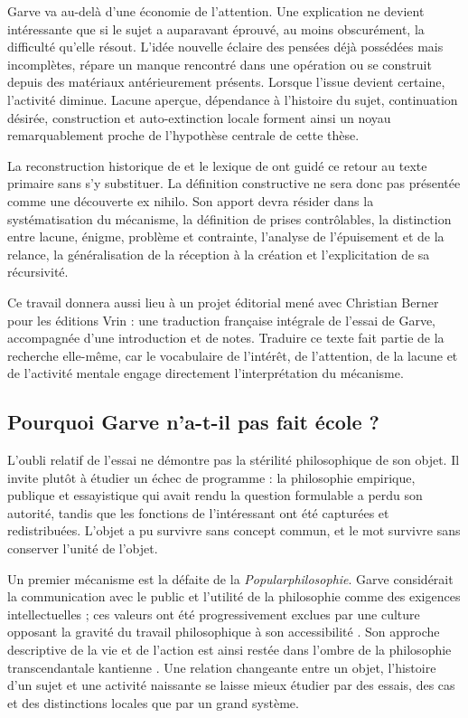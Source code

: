 \documentclass[11pt,a4paper]{article}
\begin{document}
Garve va au-delà d'une économie de l'attention. Une explication ne devient
intéressante que si le sujet a auparavant éprouvé, au moins obscurément, la
difficulté qu'elle résout. L'idée nouvelle éclaire des pensées déjà possédées
mais incomplètes, répare un manque rencontré dans une opération ou se construit
depuis des matériaux antérieurement présents. Lorsque l'issue devient certaine,
l'activité diminue. Lacune aperçue, dépendance à l'histoire du sujet,
continuation désirée, construction et auto-extinction locale forment ainsi un
noyau remarquablement proche de l'hypothèse centrale de cette thèse.

La reconstruction historique de \textcite{nannini2018garve} et le lexique de
\textcite{nannini2018interesting} ont guidé ce retour au texte primaire sans s'y
substituer. La définition constructive ne sera donc pas présentée comme une
découverte ex nihilo. Son apport devra résider dans la systématisation du
mécanisme, la définition de prises contrôlables, la distinction entre lacune,
énigme, problème et contrainte, l'analyse de l'épuisement et de la relance, la
généralisation de la réception à la création et l'explicitation de sa
récursivité.

Ce travail donnera aussi lieu à un projet éditorial mené avec Christian Berner
pour les éditions Vrin : une traduction française intégrale de l'essai de
Garve, accompagnée d'une introduction et de notes. Traduire ce texte fait partie
de la recherche elle-même, car le vocabulaire de l'intérêt, de l'attention, de
la lacune et de l'activité mentale engage directement l'interprétation du
mécanisme.

\subsection{Pourquoi Garve n'a-t-il pas fait école ?}

L'oubli relatif de l'essai ne démontre pas la stérilité philosophique de son
objet. Il invite plutôt à étudier un échec de programme : la philosophie
empirique, publique et essayistique qui avait rendu la question formulable a
perdu son autorité, tandis que les fonctions de l'intéressant ont été capturées
et redistribuées. L'objet a pu survivre sans concept commun, et le mot survivre
sans conserver l'unité de l'objet.

Un premier mécanisme est la défaite de la \emph{Popularphilosophie}. Garve
considérait la communication avec le public et l'utilité de la philosophie comme
des exigences intellectuelles ; ces valeurs ont été progressivement exclues par
une culture opposant la gravité du travail philosophique à son accessibilité
\parencite{thompson2018garve}. Son approche descriptive de la vie et de l'action
est ainsi restée dans l'ombre de la philosophie transcendantale kantienne
\parencite{bachmannmedick2008anziehungskraft}. Une relation changeante entre un
objet, l'histoire d'un sujet et une activité naissante se laisse mieux étudier
par des essais, des cas et des distinctions locales que par un grand système.
\end{document}
